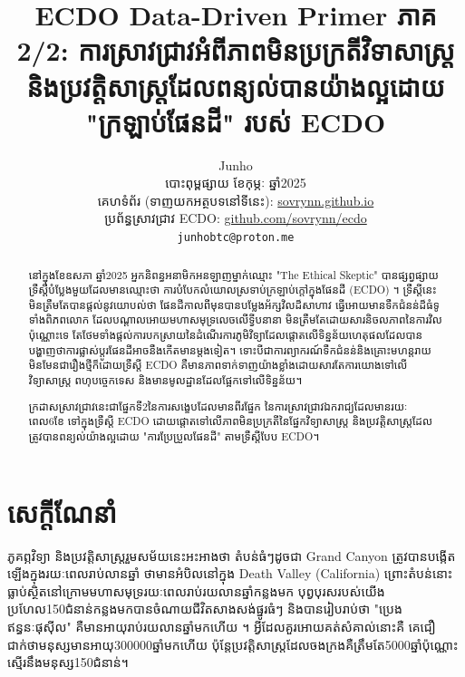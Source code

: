 \documentclass[10pt,twocolumn,letterpaper]{article}
\begin{document}
\title{ECDO Data-Driven Primer ភាគ 2/2: ការស្រាវជ្រាវអំពីភាពមិនប្រក្រតីវិទាសាស្ត្រនិងប្រវត្តិសាស្ត្រដែលពន្យល់បានយ៉ាងល្អដោយ "ក្រឡាប់ផែនដី" របស់  ECDO}

\author{Junho\\
បោះពុម្ពផ្សាយ ខែកុម្ភៈ ឆ្នាំ2025\\
គេហទំព័រ (ទាញយកអត្ថបទនៅទីនេះ): \href{https://sovrynn.github.io}{sovrynn.github.io}\\
ប្រព័ន្ធស្រាវជ្រាវ ECDO: \href{https://github.com/sovrynn/ecdo}{github.com/sovrynn/ecdo}\\
{\tt\small junhobtc@proton.me}
}

\maketitle

\begin{abstract}
នៅក្នុងខែឧសភា ឆ្នាំ2025 អ្នកនិពន្ធអនាមិកអនឡាញម្នាក់ឈ្មោះ "The Ethical Skeptic" \cite{0} បានផ្សព្វផ្សាយទ្រឹស្ដីបំប្លែងមួយដែលមានឈ្មោះថា ការបំបែកលំយោលស្រទាប់ក្រឡាប់ក្តៅក្នុងផែនដី (ECDO) \cite{1}។ ទ្រឹស្ដីនេះមិនត្រឹមតែបានផ្តល់នូវយោបល់ថា ផែនដីកាលពីមុនបានបម្លែងអ័ក្សវិលដ៏សាហាវ ធ្វើអោយមានទឹកជំនន់ដ៏ធំទូទាំងពិភពលោក ដែលបណ្តាលអោយមហាសមុទ្រលេចលើទ្វីបនានា មិនត្រឹមតែដោយសារនិចលភាពនៃការវិលប៉ុណ្ណោះទេ តែថែមទាំងផ្ដល់ការបកស្រាយនៃដំណើរការភូមិវិទ្យាដែលផ្តោតលើទិន្នន័យហេតុផលដែលបានបង្ហាញថាការផ្លាស់ប្តូរផែនដីអាចនឹងកើតមានម្តងទៀត។ ទោះបីជាការព្យាករណ៍ទឹកជំនន់និងគ្រោះមហន្តរាយមិនមែនជារឿងថ្មីក៏ដោយទ្រឹស្ដី ECDO គឺមានភាពទាក់ទាញយ៉ាងខ្លាំងដោយសារតែការយោងទៅលើវិទ្យាសាស្ត្រ ពហុបច្ចេកទេស និងមានមូលដ្ឋានដែលផ្អែកទៅលើទិន្នន័យ។

ក្រដាសស្រាវជ្រាវនេះជាផ្នែកទី2នៃការសង្ខេបដែលមានពីរផ្នែក នៃការស្រាវជ្រាវឯករាជ្យដែលមានរយៈពេល6ខែ \cite{2,20} ទៅក្នុងទ្រឹស្ដី ECDO ដោយផ្តោតទៅលើភាពមិនប្រក្រតីនៃផ្នែកវិទ្យាសាស្ត្រ និងប្រវត្តិសាស្ត្រដែលត្រូវបានពន្យល់យ៉ាងល្អដោយ "ការប្រែប្រួលផែនដី" តាមទ្រឹស្ដីបែប ECDO។

\end{abstract}

\section{សេក្តីណែនាំ}

ភូគព្ភវិទ្យា និងប្រវត្តិសាស្ត្ររួមសម័យនេះអះអាងថា តំបន់ធំៗដូចជា Grand Canyon ត្រូវបានបង្កើតឡើងក្នុងរយៈពេលរាប់លានឆ្នាំ \cite{143} ថាមានអំបិលនៅក្នុង Death Valley (California) ព្រោះតំបន់នោះធ្លាប់ស្ថិតនៅក្រោមមហាសមុទ្ររយៈពេលរាប់រយលានឆ្នាំកន្លងមក \cite{144} បុព្វបុរសរបស់យើងប្រហែល150ជំនាន់កន្លងមកបានចំណាយជីវិតសាងសង់ផ្នូរធំៗ\cite{29,70} និងបានរៀបរាប់ថា "ប្រេងឥន្ធនៈផុសុីល" គឺមានអាយុរាប់រយលានឆ្នាំមកហើយ \cite{104}។ អ្វីដែលគួរអោយគត់សំគាល់នោះគឺ គេជឿជាក់ថាមនុស្សមានអាយុ300000ឆ្នាំមកហើយ \cite{145} ប៉ុន្តែប្រវត្តិសាស្ត្រដែលចងក្រងគឺត្រឹមតែ5000ឆ្នាំប៉ុណ្ណោះ ស្មើរនឹងមនុស្ស150ជំនាន់។
\end{document}
